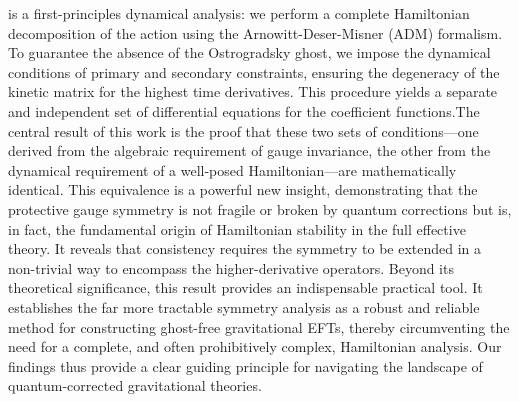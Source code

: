\documentclass[twocolumn]{aastex631}
\begin{document}
is a first-principles dynamical analysis: we perform a complete Hamiltonian decomposition of the action using the Arnowitt-Deser-Misner (ADM) formalism. To guarantee the absence of the Ostrogradsky ghost, we impose the dynamical conditions of primary and secondary constraints, ensuring the degeneracy of the kinetic matrix for the highest time derivatives. This procedure yields a separate and independent set of differential equations for the coefficient functions.The central result of this work is the proof that these two sets of conditions---one derived from the algebraic requirement of gauge invariance, the other from the dynamical requirement of a well-posed Hamiltonian---are mathematically identical. This equivalence is a powerful new insight, demonstrating that the protective gauge symmetry is not fragile or broken by quantum corrections but is, in fact, the fundamental origin of Hamiltonian stability in the full effective theory. It reveals that consistency requires the symmetry to be extended in a non-trivial way to encompass the higher-derivative operators. Beyond its theoretical significance, this result provides an indispensable practical tool. It establishes the far more tractable symmetry analysis as a robust and reliable method for constructing ghost-free gravitational EFTs, thereby circumventing the need for a complete, and often prohibitively complex, Hamiltonian analysis. Our findings thus provide a clear guiding principle for navigating the landscape of quantum-corrected gravitational theories.
\end{document}
